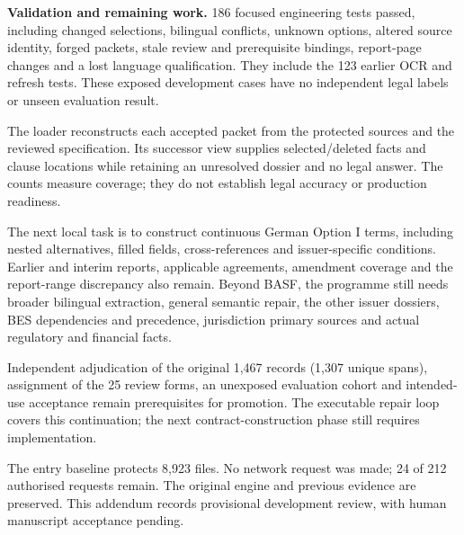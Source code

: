 \documentclass[11pt]{article}
\begin{document}
\newpage
\textbf{Validation and remaining work.}
186 focused engineering tests passed, including changed
selections, bilingual conflicts, unknown options, altered source
identity, forged packets, stale review and prerequisite bindings,
report-page changes and a lost language qualification. They include
the 123 earlier OCR and refresh tests. These exposed development cases
have no independent legal labels or unseen evaluation result.

The loader reconstructs each accepted packet from the protected
sources and the reviewed specification. Its successor view supplies
selected/deleted facts and clause locations while retaining an
unresolved dossier and no legal answer. The counts measure coverage;
they do not establish legal accuracy or production readiness.

The next local task is to construct continuous German Option I terms,
including nested alternatives, filled fields, cross-references and
issuer-specific conditions. Earlier and interim reports, applicable
agreements, amendment coverage and the report-range discrepancy also
remain. Beyond BASF, the programme still needs broader bilingual
extraction, general semantic repair, the other issuer dossiers, BES
dependencies and precedence, jurisdiction primary sources and actual
regulatory and financial facts.

Independent adjudication of the original 1,467 records (1,307 unique
spans), assignment of the 25 review forms, an unexposed evaluation cohort
and intended-use acceptance remain prerequisites for promotion.
The executable repair loop covers this continuation; the next
contract-construction phase still requires implementation.

The entry baseline protects 8,923 files. No network request was made;
24 of 212 authorised requests remain. The original engine and previous
evidence are preserved. This addendum records provisional development
review, with human manuscript acceptance pending.
\end{document}
